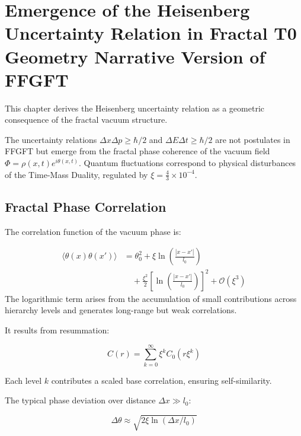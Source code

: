 \chapter{Emergence of the Heisenberg Uncertainty Relation in Fractal T0 Geometry  Narrative Version of FFGFT}


	
	This chapter derives the Heisenberg uncertainty relation as a geometric consequence of the fractal vacuum structure.
	
	
	The uncertainty relations $\Delta x \Delta p \geq \hbar/2$ and $\Delta E \Delta t \geq \hbar/2$ are not postulates in FFGFT but emerge from the fractal phase coherence of the vacuum field $\Phi = \rho(x,t) e^{i\theta(x,t)}$. Quantum fluctuations correspond to physical disturbances of the Time-Mass Duality, regulated by $\xi = \frac{4}{3} \times 10^{-4}$.
	
	\section*{Fractal Phase Correlation}
	
	The correlation function of the vacuum phase is:
	

	     \begin{equation}
		\begin{aligned}
			\langle \theta(x) \theta(x') \rangle
			&= \theta_0^2
			+ \xi \ln\!\left( \frac{|x - x'|}{l_0} \right) \\
			&\quad
			+ \frac{\xi^2}{2}
			\left[
			\ln\!\left( \frac{|x - x'|}{l_0} \right)
			\right]^2
			+ \mathcal{O}(\xi^3)
		\end{aligned}
	\end{equation}
	The logarithmic term arises from the accumulation of small contributions across hierarchy levels and generates long-range but weak correlations.
	
	It results from resummation:
	
	\begin{equation}
		C(r) = \sum_{k=0}^\infty \xi^k C_0(r \xi^k)
	\end{equation}
	
	Each level $k$ contributes a scaled base correlation, ensuring self-similarity.
	
	The typical phase deviation over distance $\Delta x \gg l_0$:
	
	\begin{equation}
		\Delta \theta \approx \sqrt{2 \xi \ln(\Delta x / l_0)}
	\end{equation}
	
